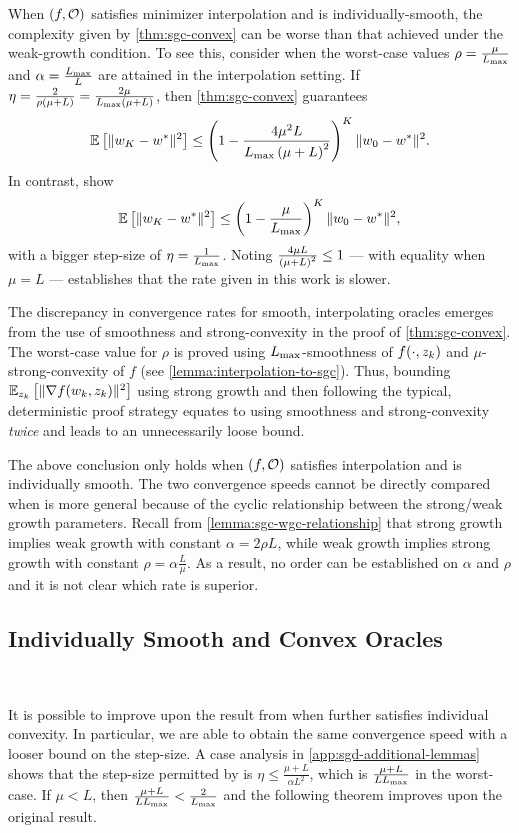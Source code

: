 When \( \rbr{f, \oracle{}} \) satisfies minimizer interpolation and \oracle{} is individually-smooth, the complexity given by \autoref{thm:sgc-convex} can be worse than that achieved under the weak-growth condition.
To see this, consider when the worst-case values \( \sgc = \frac{\mu}{\Lmax} \) and \( \wgc = \frac{\Lmax}{L} \) are attained in the interpolation setting. 
If \( \eta = \frac{2}{\sgc \rbr{\mu + L}} = \frac{2 \mu}{\Lmax\rbr{\mu + L}} \), then \autoref{thm:sgc-convex} guarantees  
\[ \E\sbr{\norm{\w_{K} - \wopt}^2} \leq \rbr{1 - \frac{4 \mu^2 L }{\Lmax \rbr{\mu + L}^2}}^K \norm{\w_0 - \wopt}^2. \]
In contrast, \citet[Theorem 5]{vaswani2019fast} show 
\[ \E\sbr{\norm{\w_{K} - \wopt}^2} \leq \rbr{1 - \frac{\mu}{\Lmax}}^K \norm{\w_0 - \wopt}^2, \]
with a bigger step-size of \( \eta = \frac{1}{\Lmax} \).
Noting \( \frac{4 \mu L}{\rbr{\mu + L}^2} \leq 1 \) --- with equality when \( \mu = L \) --- establishes that the rate given in this work is slower.

The discrepancy in convergence rates for smooth, interpolating oracles emerges from the use of smoothness and strong-convexity in the proof of \autoref{thm:sgc-convex}.
The worst-case value for \( \rho \) is proved using \( \Lmax \)-smoothness of \( f(\cdot, \zk) \) and \( \mu \)-strong-convexity of \( f \) (see \autoref{lemma:interpolation-to-sgc}).
Thus, bounding \( \Ek\sbr{\norm{\grad(\wk, \zk)}^2} \) using strong growth and then following the typical, deterministic proof strategy equates to using smoothness and strong-convexity \emph{twice} and leads to an unnecessarily loose bound.

The above conclusion only holds when \( \rbr{f, \oracle} \) satisfies interpolation and \oracle{} is individually smooth. 
The two convergence speeds cannot be directly compared when \oracle{} is more general because of the cyclic relationship between the strong/weak growth parameters. 
Recall from \autoref{lemma:sgc-wgc-relationship} that strong growth implies weak growth with constant \( \alpha = 2 \rho L \), while weak growth implies strong growth with constant \( \rho = \alpha \frac{L}{\mu} \).
As a result, no order can be established on \( \alpha \) and \( \rho \) and it is not clear which rate is superior.

\subsection{Individually Smooth and Convex Oracles}~\label{sec:sgd-sgc-ind-convex}

It is possible to improve upon the result from \citet{vaswani2019fast} when \oracle{} further satisfies individual convexity.
In particular, we are able to obtain the same convergence speed with a looser bound on the step-size.
A case analysis in \autoref{app:sgd-additional-lemmas} shows that the step-size permitted by \citet[Theorem 5]{vaswani2019fast} is \( \eta \leq \frac{\mu + L}{\alpha L^2} \), which is \( \frac{\mu + L}{L \Lmax}\) in the worst-case.
If \( \mu < L \), then \( \frac{\mu + L}{L \Lmax} < \frac{2}{\Lmax} \) and the following theorem improves upon the original result. 

